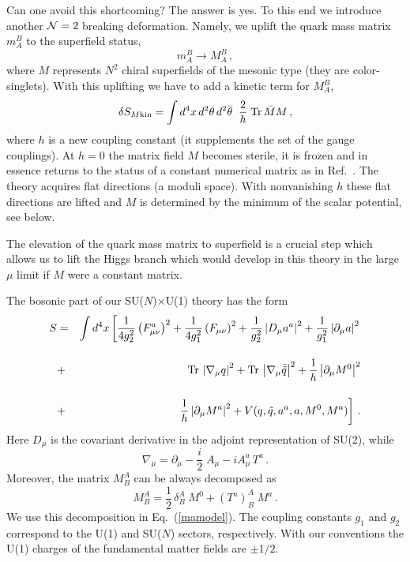 \documentclass[epsfig,12pt]{article}
\def\beqn{\begin{eqnarray}}
\def\eeqn{\end{eqnarray}}
\def\beq{\begin{equation}}
\def\eeq{\end{equation}}
\newcommand{\ntwo}{${\cal N}=2\;$}
\newcommand{\pt}{\partial}
\begin{document}
 \vspace{2mm}
 
 Can one avoid this shortcoming? The answer is yes.
To this end we introduce another \ntwo breaking deformation. Namely,
we uplift the quark mass matrix $m_A^B$ to 
the superfield status,
$$
m_A^B \to M_A^B\,,
$$
where $M$ represents $N^2$ chiral superfields of the mesonic type
(they are color-singlets). With this uplifting we have to 
add a kinetic term for $ M_A^B$,
\beq
\delta S_{M\rm kin} = \int d^4x \, d^2\theta \, d^2\bar{\theta}\; \;\frac{2}{h}\; {\rm Tr}\,\bar{M}M
\,,
\label{mkin}
\eeq
where $h$ is a new coupling constant 
(it supplements the set of the gauge couplings).
At $h=0$ the matrix field $M$ becomes sterile, it is frozen and in essence 
returns to the status
of a constant numerical matrix as in Ref.~\cite{SYnone}. The theory
acquires flat directions (a moduli space). 
With nonvanishing $h$ these flat directions are lifted and $M$ is
determined by the minimum of the scalar potential, see below.

The elevation of the quark mass matrix to superfield is a crucial step
which allows us to lift the Higgs branch which would develop in this
theory in the large $\mu$ limit if $M$ were a constant matrix.

The bosonic part of our SU($N$)$\times$U(1)
theory has  the form
\beqn
S&=&\int d^4x \left[\frac1{4g^2_2}
\left(F^{a}_{\mu\nu}\right)^2 +
\frac1{4g^2_1}\left(F_{\mu\nu}\right)^2
+
\frac1{g^2_2}\left|D_{\mu}a^a\right|^2 +\frac1{g^2_1}
\left|\partial_{\mu}a\right|^2 \right.
\nonumber\\[4mm]
&+& {\rm Tr}\,\left|\nabla_{\mu}
q\right|^2 + {\rm Tr}\,\left|\nabla_{\mu} \bar{\tilde{q}}\right|^2
+\frac1h \left|\pt_{\mu} M^0\right|^2
\nonumber\\[4mm]
&+& 
\left.
\frac1h \left|\pt_{\mu} M^a\right|^2
+V(q,\tilde{q},a^a,a,M^0,M^a)\right]\,.
\label{mamodel}
\eeqn
Here $D_{\mu}$ is the covariant derivative in the adjoint representation
of  SU(2),
while
\beq
\nabla_\mu=\partial_\mu -\frac{i}{2}\; A_{\mu}
-i A^{a}_{\mu}\,T^a\,.
\label{defnabla}
\eeq
Moreover, the matrix $M^A_B$ can be always decomposed as
\beq
M^A_B=\frac12\, \delta_B^A\;M^0 +(T^a)^A_B\;M^a\,.
\label{adjointM}
\eeq
We use this decomposition in Eq.~(\ref{mamodel}). The coupling constants 
$g_1$ and $g_2$
correspond to the U(1)  and  SU($N$)  sectors, respectively.
With our conventions the U(1) charges of the fundamental matter fields 
are $\pm 1/2$.

\vspace{2mm}
\end{document}
